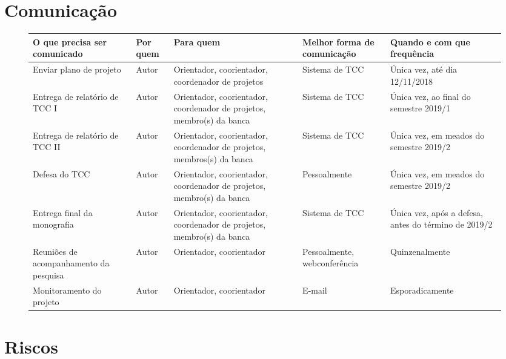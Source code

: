 \documentclass{ufsctex/ufsctex}
\begin{document}
\chapter{Comunicação}

\begin{figure}[htbp]
  \footnotesize
  \begin{tabular}{|P{1.9cm}|P{0.7cm}|P{2.5cm}|P{1.5cm}|P{2cm}|}
    \hline {}
    \textbf{O que precisa ser comunicado} & \textbf{Por quem}
      & \textbf{Para quem} & \textbf{Melhor forma de comunicação}
      & \textbf{Quando e com que frequência} \\
    \hline Enviar plano de projeto & Autor
      & Orientador, coorientador, coordenador de projetos & Sistema de TCC
      & Única vez, até dia 12/11/2018 \\
    \hline Entrega de relatório de TCC I & Autor
      & Orientador, coorientador, coordenador de projetos,
      membro(s) da banca & Sistema de TCC
      & Única vez, ao final do semestre 2019/1 \\
    \hline Entrega de relatório de TCC II & Autor
      & Orientador, coorientador, coordenador de projetos,
      membros(s) da banca & Sistema de TCC
      & Única vez, em meados do semestre 2019/2 \\
    \hline Defesa do TCC & Autor
      & Orientador, coorientador, coordenador de projetos,
      membro(s) da banca & Pessoalmente
      & Única vez, em meados do semestre 2019/2 \\
    \hline Entrega final da monografia & Autor
      & Orientador, coorientador, coordenador de projetos,
      membro(s) da banca & Sistema de TCC
      & Única vez, após a defesa, antes do término de 2019/2 \\
    \hline Reuniões de acompanhamento da pesquisa & Autor
      & Orientador, coorientador & Pessoalmente, webconferência
      & Quinzenalmente \\
    \hline Monitoramento do projeto & Autor
      & Orientador, coorientador & E-mail & Esporadicamente \\
    \hline
  \end{tabular}
\end{figure}

\chapter{Riscos}
\end{document}
